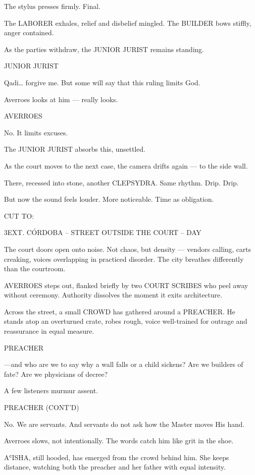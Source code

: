 \documentclass[12pt]{article}
\newlength{\charindent}
\newlength{\dialogueindent}
\newlength{\dialoguewidth}
\newlength{\transitionindent}
\newcommand{\slug}[1]{%
  \needspace{4\baselineskip}%
  \vspace{1.5em}%
  \noindent\MakeUppercase{#1}%
  \nopagebreak[4]%
  \par\vspace{0.75em}%
}
\newcommand{\action}[1]{%
  \noindent#1\par\vspace{0.75em}%
}
\newcommand{\character}[1]{%
  \needspace{3\baselineskip}%
  \par\vspace{0.5em}%
  \noindent\hspace*{\charindent}\MakeUppercase{#1}\nopagebreak[4]%
}
\newcommand{\dialogue}[1]{%
  \par\nobreak\nopagebreak[4]%
  \noindent\hspace*{\dialogueindent}%
  \begin{minipage}[t]{\dialoguewidth}
  #1
  \end{minipage}%
  \par\vspace{0.5em}%
}
\newcommand{\transition}[1]{%
  \needspace{2\baselineskip}%
  \par\vspace{1em}%
  \noindent\hspace*{\transitionindent}\MakeUppercase{#1}%
  \par%
}
\newcommand{\contd}{\textsc{(cont'd)}}
\begin{document}
\action{The stylus presses firmly. Final.}

\action{The LABORER exhales, relief and disbelief mingled. The BUILDER bows stiffly, anger contained.}

\action{As the parties withdraw, the JUNIOR JURIST remains standing.}

\character{JUNIOR JURIST}
\dialogue{Qadi… forgive me. But some will say that this ruling limits God.}

\action{Averroes looks at him — really looks.}

\character{AVERROES}
\dialogue{No. It limits excuses.}

\action{The JUNIOR JURIST absorbs this, unsettled.}

\action{As the court moves to the next case, the camera drifts again — to the side wall.}

\action{There, recessed into stone, another CLEPSYDRA. Same rhythm. Drip. Drip.}

\action{But now the sound feels louder. More noticeable. Time as obligation.}

\transition{CUT TO:}

\slug{3\quad EXT. C\'ORDOBA -- STREET OUTSIDE THE COURT -- DAY}

\action{The court doors open onto noise. Not chaos, but density — vendors calling, carts creaking, voices overlapping in practiced disorder. The city breathes differently than the courtroom.}

\action{AVERROES steps out, flanked briefly by two COURT SCRIBES who peel away without ceremony. Authority dissolves the moment it exits architecture.}

\action{Across the street, a small CROWD has gathered around a PREACHER. He stands atop an overturned crate, robes rough, voice well-trained for outrage and reassurance in equal measure.}

\character{PREACHER}
\dialogue{—and who are we to say why a wall falls or a child sickens? Are we builders of fate? Are we physicians of decree?}

\action{A few listeners murmur assent.}

\character{PREACHER \contd}
\dialogue{No. We are servants. And servants do not ask how the Master moves His hand.}

\action{Averroes slows, not intentionally. The words catch him like grit in the shoe.}

\action{AʿISHA, still hooded, has emerged from the crowd behind him. She keeps distance, watching both the preacher and her father with equal intensity.}
\end{document}
